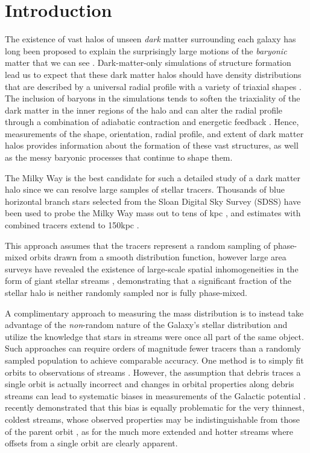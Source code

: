 \documentclass{emulateapj}
\begin{document}
\section{Introduction}
\label{intro.sec}
 The existence of vast halos of unseen {\it dark} matter surrounding each galaxy has long been proposed to explain the surprisingly large
motions of the {\it baryonic} matter that we can see \citep[e.g.,][]{rubin70}.
Dark-matter-only simulations of structure formation lead us to expect that these dark matter halos should have density distributions that are described by a universal radial profile \citep{navarro96} with a variety of triaxial shapes \citep{jing02}.
The inclusion of baryons in the simulations tends to soften the triaxiality of the dark matter in the inner regions of the halo \citep[e.g., as the disk forms,][]{bailin05} and
can alter the radial profile through a combination of adiabatic contraction and energetic feedback \citep[e.g.][]{pontzen12}.
Hence, measurements of the shape, orientation, radial profile, and extent of dark matter halos provides information about the formation of these vast structures, as well as the messy baryonic processes that continue to shape them.

The Milky Way is the best candidate for such a detailed study of a dark matter halo
since we can resolve large samples of stellar tracers.
Thousands of blue horizontal branch stars selected from the Sloan Digital Sky Survey (SDSS) have been used to probe the Milky Way mass out to tens of
kpc \citep[SDSS, see][]{deason12a,kafle12}, and estimates with combined tracers extend to 150kpc \citep{deason12b}.

This approach assumes that the tracers represent a random sampling of phase-mixed orbits drawn from a smooth distribution function, however large area surveys have revealed the existence of large-scale spatial inhomogeneities in the form of giant stellar streams \citep{newberg02,majewski03,belokurov06}, demonstrating that a significant fraction of the stellar halo is neither randomly sampled nor is fully phase-mixed.

A complimentary approach to measuring the mass distribution is to instead take advantage of the {\it non}-random nature of the Galaxy's stellar distribution and utilize the knowledge that stars in streams were once all part of the same object.
Such approaches can require orders of magnitude fewer tracers than a randomly sampled population to achieve comparable accuracy.
One method is to simply fit orbits to observations of streams 
\citep[e.g.,][]{koposov10}.
However, the assumption that debris traces a single orbit is actually incorrect \citep[see][]{johnston98,helmi99} and
changes in orbital properties along debris streams can lead to systematic biases in measurements of the Galactic potential \citep{eyre09a,varghese11}.
\citet{sanders13a} recently demonstrated that this bias is equally problematic for the very thinnest, coldest streams, whose observed properties may be indistinguishable from those of the parent orbit \citep[e.g. such as the globular cluster, GD1 --- see][]{koposov10}, as for the much more extended and hotter streams \citep[e.g. such as debris from the Sagittarius dwarf galaxy --- see][]{majewski03} where offsets from a single orbit are clearly apparent.
\end{document}
